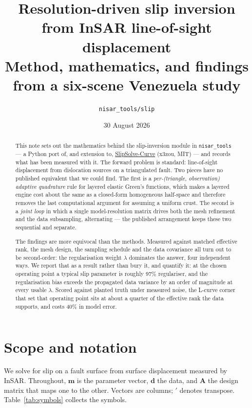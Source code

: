 \documentclass[11pt,a4paper]{article}
\title{\bf Resolution-driven slip inversion from InSAR line-of-sight
displacement\\[2mm] \large Method, mathematics, and findings from a six-scene
Venezuela study}
\author{\texttt{nisar\_tools/slip}}
\date{30 August 2026}
\newcommand{\A}{\mathbf{A}}
\newcommand{\bfm}{\bm{m}}
\newcommand{\bfd}{\bm{d}}
\begin{document}
\maketitle

\begin{abstract}
\noindent
This note sets out the mathematics behind the slip-inversion module in
\texttt{nisar\_tools} --- a Python port of, and extension to,
\href{https://github.com/x3zou/SlipSolve-Curve}{SlipSolve-Curve} (x3zou, MIT) ---
and records what has been measured with it. The forward
problem is standard: line-of-sight displacement from dislocation sources on a
triangulated fault. Two pieces have no published equivalent that we could find.
The first is a \emph{per-(triangle, observation) adaptive quadrature} rule for
layered elastic Green's functions, which makes a layered engine cost about the
same as a closed-form homogeneous half-space and therefore removes the last
computational argument for assuming a uniform crust. The second is a
\emph{joint loop} in which a single model-resolution matrix drives both the mesh
refinement and the data subsampling, alternating --- the published arrangement
keeps these two sequential and separate.

The findings are more equivocal than the methods. Measured against matched
effective rank, the mesh design, the sampling schedule and the data covariance
all turn out to be second-order: the regularisation weight $\lambda$ dominates
the answer, four independent ways. We report that as a result rather than
bury it, and quantify it: at the chosen operating point a typical slip parameter
is roughly 97\% regulariser, and the regularisation bias exceeds the propagated
data variance by an order of magnitude at every usable $\lambda$. Scored against
planted truth under measured noise, the L-curve corner that set that operating
point sits at about a quarter of the effective rank the data supports, and costs
40\% in model error.
\end{abstract}

\tableofcontents

\section{Scope and notation}

We solve for slip on a fault surface from surface displacement measured by
InSAR. Throughout, $\bfm$ is the parameter vector, $\bfd$ the data, and $\A$
the design matrix that maps one to the other. Vectors are columns; $'$ denotes
transpose. Table~\ref{tab:symbols} collects the symbols.
\end{document}
